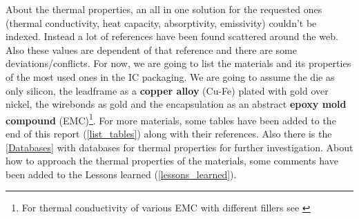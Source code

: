 \documentclass[final]{cubedoc}
\begin{document}
About the thermal properties, an all in one solution for the requested ones (thermal conductivity, heat capacity, absorptivity, emissivity) couldn't be indexed. Instead a lot of references have been found scattered around the web. Also these values are dependent of that reference and there are some deviations/conflicts. For now, we are going to list the materials and its properties of the most used ones in the IC packaging. We are going to assume the die as only silicon, the leadframe as a \textbf{copper alloy} (Cu-Fe) plated with gold over nickel, the wirebonds as gold and the encapsulation as an abstract \textbf{epoxy mold compound} (EMC)\footnote{For thermal conductivity of various EMC with different fillers see \cite{caplinqepoxcondu}}. For more materials, some tables have been added to the end of this report (\cref{list_tables}) along with their references. Also there is the \cref{Databases} with databases for thermal properties for further investigation. About how to approach the thermal properties of the materials, some comments have been added to the Lessons learned (\cref{lessons_learned}).

\begin{table}[h!]
    \centering
\caption{Material Bulk properties of QFP}
\label{tab:my_label}
\end{table}
\end{document}
